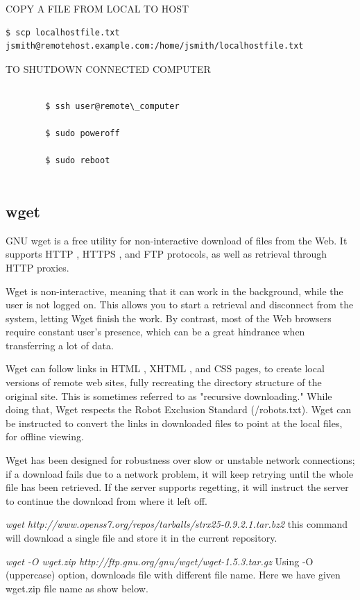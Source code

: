 \documentclass{article}
\begin{document}
COPY A FILE FROM LOCAL TO HOST
\begin{verbatim}
$ scp localhostfile.txt jsmith@remotehost.example.com:/home/jsmith/localhostfile.txt
\end{verbatim}

TO SHUTDOWN CONNECTED COMPUTER 
		\begin{verbatim}

		$ ssh user@remote\_computer
		
		$ sudo poweroff
		
		$ sudo reboot 
		
		\end{verbatim}


\subsection{wget}


GNU wget \cite{wgetweb} is a free utility for non-interactive download of files from the Web. It supports HTTP , HTTPS , and FTP protocols, as well as retrieval through HTTP proxies.

Wget is non-interactive, meaning that it can work in the background, while the user is not logged on. This allows you to start a retrieval and disconnect from the system, letting Wget finish the work. By contrast, most of the Web browsers require constant user's presence, which can be a great hindrance when transferring a lot of data.

Wget can follow links in HTML , XHTML , and CSS pages, to create local versions of remote web sites, fully recreating the directory structure of the original site. This is sometimes referred to as "recursive downloading." While doing that, Wget respects the Robot Exclusion Standard (/robots.txt). Wget can be instructed to convert the links in downloaded files to point at the local files, for offline viewing.

Wget has been designed for robustness over slow or unstable network connections; if a download fails due to a network problem, it will keep retrying until the whole file has been retrieved. If the server supports regetting, it will instruct the server to continue the download from where it left off.

\hspace{10mm} \textit{wget http://www.openss7.org/repos/tarballs/strx25-0.9.2.1.tar.bz2} this command will download a single file and store it in the current repository.

\hspace{10mm} \textit{wget -O wget.zip http://ftp.gnu.org/gnu/wget/wget-1.5.3.tar.gz} Using -O (uppercase) option, downloads file with different file name. Here we have given wget.zip file name as show below.
\end{document}
